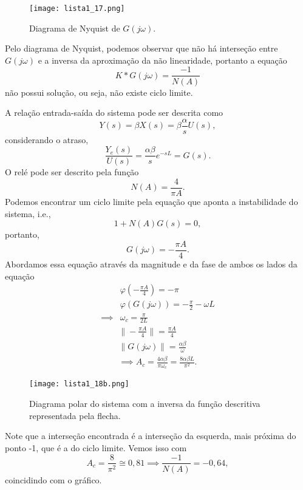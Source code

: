 \documentclass[a4paper]{report}
\begin{document}

\begin{figure}[H]
    \centering
    \texttt{[image: lista1\_17.png]}
    \caption{Diagrama de Nyquist de $G(j\omega)$.}
    \label{fig:lista1_17-png}
\end{figure}

Pelo diagrama de Nyquist, podemos observar que não há interseção entre $G(j\omega)$ e a inversa da aproximação da não linearidade, portanto a equação \[
    K*G(j\omega) = \frac{-1}{N(A)}
\] não possui solução, ou seja, não existe ciclo limite.



A relação entrada-saída do sistema pode ser descrita como \[
Y(s) = \beta X(s) = \beta \frac{\alpha}{s} U(s)
,\] considerando o atraso, \[
\frac{Y_e(s)}{U(s)} = \frac{\alpha \beta}{s}e^{-sL} = G(s)
.\] O relé pode ser descrito pela função \[
N(A) = \frac{4}{\pi A}
.\] Podemos encontrar um ciclo limite pela equação que aponta a instabilidade do sistema, i.e., \[
1+N(A)G(s) = 0
,\] portanto, \[
G(j\omega) = -\frac{\pi A}{4}
.\] Abordamos essa equação através da magnitude e da fase de ambos os lados da equação
\begin{align*}
    & \varphi \left( -\frac{\pi A}{4} \right) = -\pi \\
    & \varphi \left( G(j\omega) \right) = -\frac{\pi}{2} - \omega L \\
    \implies & \omega_c = \frac{\pi}{2L}
\end{align*}
\begin{align*}
    \|-\frac{\pi A}{4}\| = \frac{\pi A}{4} \\
    \|G(j\omega)\| = \frac{\alpha \beta}{\omega} \\
    \implies A_c = \frac{4 \alpha \beta}{\pi \omega_c} = \frac{8 \alpha \beta L}{\pi^2}
.\end{align*}


\begin{figure}[H]
    \centering
    \texttt{[image: lista1\_18b.png]}
    \caption{Diagrama polar do sistema com a inversa da função descritiva representada pela flecha.}
    \label{fig:lista1_18b-png}
\end{figure}

Note que a interseção encontrada é a interseção da esquerda, mais próxima do ponto -1, que é a do ciclo limite. Vemos isso com \[
    A_c = \frac{8}{\pi^2} \cong 0,81 \implies \frac{-1}{N(A)} = -0,64
,\] coincidindo com o gráfico.
\end{document}
